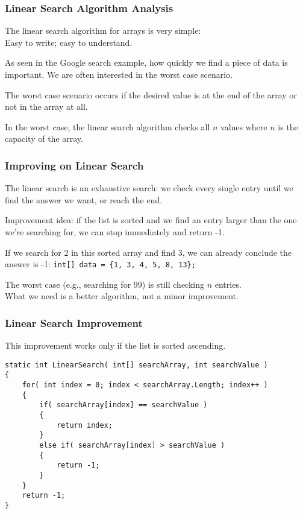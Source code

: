 \begin{frame}
\frametitle{Linear Search Algorithm Analysis}

The linear search algorithm for arrays is very simple:\\
\quad Easy to write; easy to understand.

As seen in the Google search example, how quickly we find a piece of data is important. We are often interested in the worst case scenario.

The worst case scenario occurs if the desired value is at the end of the array or not in the array at all.

In the worst case, the linear search algorithm checks all $n$ values where $n$ is the capacity of the array.

\end{frame}


\begin{frame}
\frametitle{Improving on Linear Search}
The linear search is an exhaustive search: we check every single entry until we find the answer we want, or reach the end.

Improvement idea: if the list is sorted and we find an entry larger than the one we're searching for, we can stop immediately and return -1.

If we search for 2 in this sorted array and find 3, we can already conclude the answer is -1:  \texttt{int[] data = \{1, 3, 4, 5, 8, 13\};}

The worst case (e.g., searching for 99) is still checking $n$ entries.\\
\quad What we need is a better algorithm, not a minor improvement.

\end{frame}

\begin{frame}[fragile]
\frametitle{Linear Search Improvement}

This improvement works only if the list is sorted ascending.

{\scriptsize
\begin{verbatim}
static int LinearSearch( int[] searchArray, int searchValue )
{
    for( int index = 0; index < searchArray.Length; index++ )
    {
        if( searchArray[index] == searchValue )
        {
            return index;
        }
        else if( searchArray[index] > searchValue )
        {
            return -1;
        }
    }
    return -1;
}
\end{verbatim}
}
\end{frame}

